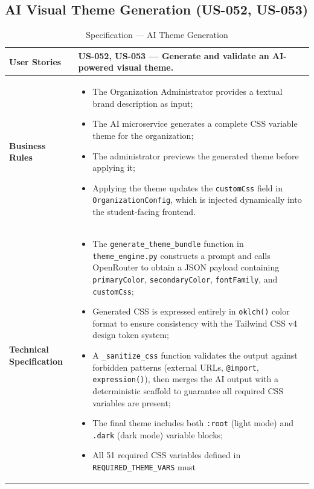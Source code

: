 \subsection{AI Visual Theme Generation (US-052, US-053)}

\begin{table}[H]
\centering
\caption{Specification — AI Theme Generation}
\label{tab:theme_spec}
\renewcommand{\arraystretch}{1.2}
\begin{tabularx}{\textwidth}{|p{3.5cm}|X|}
\hline
\textbf{User Stories} & US-052, US-053 — Generate and validate an AI-powered visual theme. \\
\hline
\textbf{Business Rules} &
\begin{itemize}[noitemsep, topsep=2pt]
  \item The Organization Administrator provides a textual brand description as input;
  \item The AI microservice generates a complete CSS variable theme for the organization;
  \item The administrator previews the generated theme before applying it;
  \item Applying the theme updates the \texttt{customCss} field in \texttt{OrganizationConfig},
        which is injected dynamically into the student-facing frontend.
\end{itemize} \\
\hline
\textbf{Technical Specification} &
\begin{itemize}[noitemsep, topsep=2pt]
  \item The \texttt{generate\_theme\_bundle} function in \texttt{theme\_engine.py}
        constructs a prompt and calls OpenRouter to obtain a JSON payload containing
        \texttt{primaryColor}, \texttt{secondaryColor}, \texttt{fontFamily}, and
        \texttt{customCss};
  \item Generated CSS is expressed entirely in \texttt{oklch()} color format to ensure
        consistency with the Tailwind CSS v4 design token system;
  \item A \texttt{\_sanitize\_css} function validates the output against forbidden
        patterns (external URLs, \texttt{@import}, \texttt{expression()}), then merges
        the AI output with a deterministic scaffold to guarantee all required CSS
        variables are present;
  \item The final theme includes both \texttt{:root} (light mode) and \texttt{.dark}
        (dark mode) variable blocks;
  \item All 51 required CSS variables defined in \texttt{REQUIRED\_THEME\_VARS} must

\end{itemize}
\end{tabularx}
\end{table}
